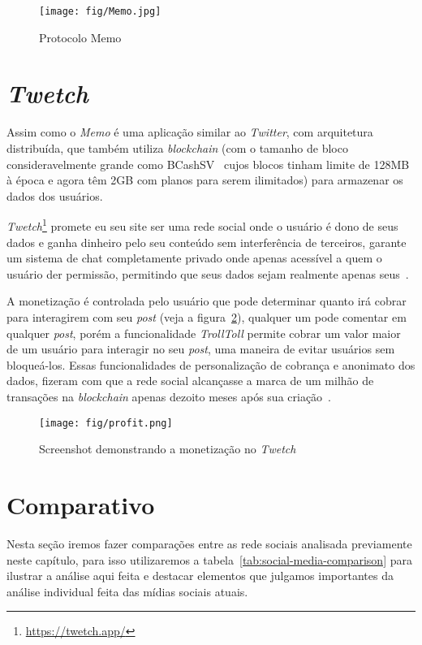 \begin{figure}[H]
    \centering
    \texttt{[image: fig/Memo.jpg]}
    \caption[Protocolo Memo]{\label{fig:memo-protocol}
        Protocolo Memo~\cite{Memo1}
    }
\end{figure}

\section{\textit{Twetch}}

Assim como o \textit{Memo} é uma aplicação similar ao \textit{Twitter}, com arquitetura distribuída, que também utiliza \textit{blockchain} (com o tamanho de bloco consideravelmente grande como BCashSV~\cite{BTCSV} cujos blocos tinham limite de 128MB à época e agora têm 2GB com planos para serem ilimitados) para armazenar os dados dos usuários.

\textit{Twetch}\footnote{\url{https://twetch.app/}} promete eu seu site ser uma rede social onde o usuário é dono de seus dados e ganha dinheiro pelo seu conteúdo sem interferência de terceiros, garante um sistema de chat completamente privado onde apenas acessível a quem o usuário der permissão, permitindo que seus dados sejam realmente apenas seus~\cite{Twetch1}.

A monetização é controlada pelo usuário que pode determinar quanto irá cobrar para interagirem com seu \textit{post} (veja a figura~\ref{fig:twetch-profit}), qualquer um pode comentar em qualquer \textit{post}, porém a funcionalidade \textit{TrollToll} permite cobrar um valor maior de um usuário para interagir no seu \textit{post}, uma maneira de evitar usuários sem bloqueá-los.
Essas funcionalidades de personalização de cobrança e anonimato dos dados, fizeram com que a rede social alcançasse a marca de um milhão de transações na \textit{blockchain} apenas dezoito meses após sua criação~\cite{Twetch2}.

\begin{figure}[H]
    \centering
    \texttt{[image: fig/profit.png]}
    \caption[Monetização no Twetch]{\label{fig:twetch-profit}
        Screenshot demonstrando a monetização no \textit{Twetch}~\cite{Twetch1}
    }
\end{figure}

\section{Comparativo}

Nesta seção iremos fazer comparações entre as rede sociais analisada previamente neste capítulo, para isso utilizaremos a tabela~\ref{tab:social-media-comparison} para ilustrar a análise aqui feita e destacar elementos que julgamos importantes da análise individual feita das mídias sociais atuais.

